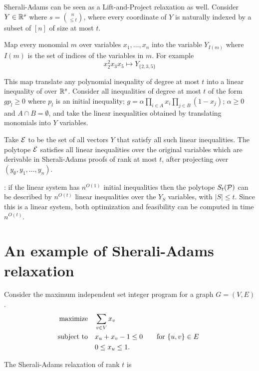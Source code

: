 \documentclass[a4paper,twoside,justified]{tufte-handout}
\begin{document}
Sherali-Adams can be seen as a Lift-and-Project relaxation as
well. Consider $ Y\in \mathbb{R}^{s} $ where $ s=\binom{n}{\leq t} $,
where every coordinate of $ Y $ is naturally indexed by a subset
of $ [n] $ of size at most $ t $.

Map every monomial $m$ over variables $ x_{1}, \ldots, x_{n} $ into the variable $
Y_{I(m)}$ where $ I(m) $ is the set of indices of the variables in $ m
$.  For example
\begin{equation*}
x^{2}_{2} x_{3}x_{5} \mapsto Y_{\{2,3,5\}} 
\end{equation*}

This map translate any polynomial inequality of degree at most $ t $
into a linear inequality of over $ \mathbb{R}^{s} $. Consider all
inequalities of degree at most $t$ of the form $ g p_{l}\geq 0 $ where
$ p_{l} $ is an initial inequality; $ g = \alpha \prod_{i\in A} x_{i}
\prod_{j \in B}(1-x_{j}) $; $ \alpha\geq 0 $ and $ A\cap B=\emptyset
$, and take the linear inequalities obtained by translating monomials
into $Y$ variables.

Take $ \mathcal{E} $ to be the set of all vectors $ Y $ that satisfy all
such linear inequalities. The polytope $ \mathcal{E} $ satisfies all
linear inequalities over the original variables which are derivable in
Sherali-Adams proofs of rank at most $ t $, after projecting over $
(y_{\emptyset},y_{1},\ldots,y_{n})$.


: if the linear system has $ n^{O(1)} $
initial inequalities then the polytope $ S_{t}(\mathcal{P}) $ can be
described by $ n^{O(t)} $ linear inequalities over the $ Y_{S} $
variables, with $ |S|\leq t $. Since this is a linear system, both
optimization and feasibility can be computed in time $ n^{O(t)} $.

\section{An example of Sherali-Adams relaxation}

Consider the maximum independent set integer program for a graph $
G=(V,E)$.
\begin{alignat}{2}
  \text{maximize}\hspace{1em}& \sum_{v\in V} x_{v}\notag \\
  \text{subject to}\hspace{1em}& x_{u} + x_{v} - 1\leq 0 \qquad \text{for $ \{u,v\}\in E $ }\\
  & 0 \leq x_{u}\leq 1.\notag
\end{alignat}

The Sherali-Adams relaxation of rank $t$ is
\end{document}
